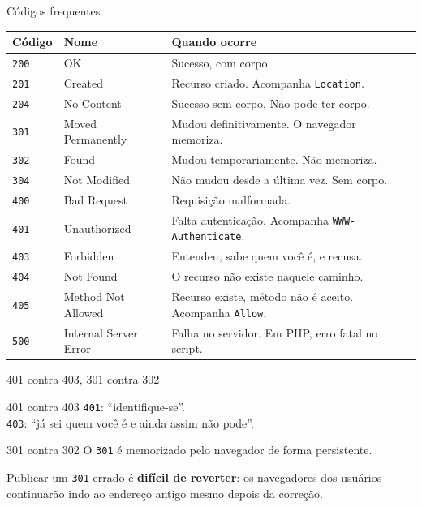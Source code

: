 \documentclass{beamer}
\begin{document}
\begin{frame}{Códigos frequentes}
  \begin{center}
    \scriptsize
    \begin{tabular}{@{}llp{5.6cm}@{}}
      \toprule
      \textbf{Código} & \textbf{Nome} & \textbf{Quando ocorre} \\
      \midrule
      \texttt{200} & OK                    & Sucesso, com corpo. \\
      \texttt{201} & Created               & Recurso criado. Acompanha \texttt{Location}. \\
      \texttt{204} & No Content            & Sucesso sem corpo. Não pode ter corpo. \\
      \texttt{301} & Moved Permanently     & Mudou definitivamente. O navegador memoriza. \\
      \texttt{302} & Found                 & Mudou temporariamente. Não memoriza. \\
      \texttt{304} & Not Modified          & Não mudou desde a última vez. Sem corpo. \\
      \texttt{400} & Bad Request           & Requisição malformada. \\
      \texttt{401} & Unauthorized          & Falta autenticação. Acompanha \texttt{WWW-Authenticate}. \\
      \texttt{403} & Forbidden             & Entendeu, sabe quem você é, e recusa. \\
      \texttt{404} & Not Found             & O recurso não existe naquele caminho. \\
      \texttt{405} & Method Not Allowed    & Recurso existe, método não é aceito. Acompanha \texttt{Allow}. \\
      \texttt{500} & Internal Server Error & Falha no servidor. Em PHP, erro fatal no script. \\
      \bottomrule
    \end{tabular}
  \end{center}
\end{frame}

\begin{frame}{401 contra 403, 301 contra 302}
  \begin{block}{401 contra 403}
    \texttt{401}: ``identifique-se''. \\
    \texttt{403}: ``já sei quem você é e ainda assim não pode''.
  \end{block}

  \begin{block}{301 contra 302}
    O \texttt{301} é memorizado pelo navegador de forma persistente.

    \vspace{0.2cm}
    Publicar um \texttt{301} errado é \textbf{difícil de reverter}: os
    navegadores dos usuários continuarão indo ao endereço antigo mesmo depois
    da correção.
  \end{block}
\end{frame}
\end{document}
